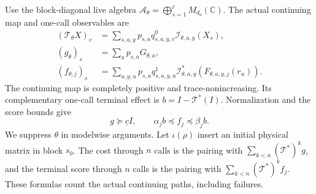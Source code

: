 Use the block-diagonal live algebra $\mathcal A_\theta=\bigoplus_{s=1}^\ell M_{d_\theta}(\mathbb C)$. The actual continuing map and one-call observables are
\begin{align}
 (\mathcal T_\theta X)_v
 &=\sum_{s,a,y}p_{s,a}q^0_{s,a,y,v}\mathcal I_{\theta,a,y}(X_s),\label{eq:memory-T}\\
 (g_\theta)_s&=\sum_a p_{s,a}G_{\theta,a},\label{eq:memory-g}\\
 (f_{\theta,j})_s&=\sum_{a,y,u}p_{s,a}q^1_{s,a,y,u}
       \mathcal I_{\theta,a,y}^*(F_{\theta,a,y,j}(r_u)).\label{eq:memory-f}
\end{align}
The continuing map is completely positive and trace-nonincreasing. Its complementary one-call terminal effect is $b=I-\mathcal T^*(I)$. Normalization and the score bounds give
\begin{equation}\label{eq:memory-bound}
 g\succeq\underline c I,\qquad
 \alpha_jb\preccurlyeq f_j\preccurlyeq\beta_jb.
\end{equation}
We suppress $\theta$ in modelwise arguments. Let $\iota(\rho)$ insert an initial physical matrix in block $s_0$. The cost through $n$ calls is the pairing with $\sum_{k<n}(\mathcal T^*)^kg$, and the terminal score through $n$ calls is the pairing with $\sum_{k<n}(\mathcal T^*)^kf_j$. These formulas count the actual continuing paths, including failures.

